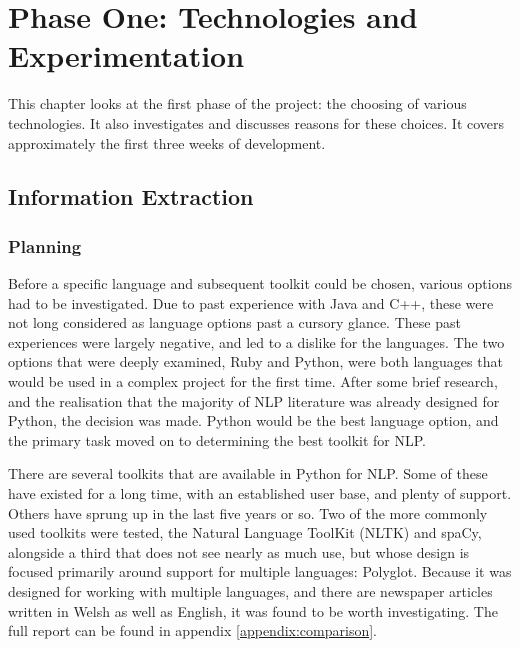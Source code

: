 \documentclass[11pt,a4paper]{book}
\begin{document}
\chapter{Phase One: Technologies and Experimentation}
This chapter looks at the first phase of the project: the choosing of various technologies. It also investigates and discusses reasons for these choices. It covers approximately the first three weeks of development.

\section{Information Extraction}
\subsection{Planning}
Before a specific language and subsequent toolkit could be chosen, various options had to be investigated. Due to past experience with Java and C++, these were not long considered as language options past a cursory glance. These past experiences were largely negative, and led to a dislike for the languages. 
The two options that were deeply examined, Ruby and Python, were both languages that would be used in a complex project for the first time. After some brief research, and the realisation that the majority of NLP literature was already designed for Python, the decision was made. Python would be the best language option, and the primary task moved on to determining the best toolkit for NLP. 

There are several toolkits that are available in Python for NLP. Some of these have existed for a long time, with an established user base, and plenty of support. Others have sprung up in the last five years or so. Two of the more commonly used toolkits were tested, the Natural Language ToolKit (NLTK) and spaCy, alongside a third that does not see nearly as much use, but whose design is focused primarily around support for multiple languages: Polyglot. Because it was designed for working with multiple languages, and there are newspaper articles written in Welsh as well as English, it was found to be worth investigating. The full report can be found in appendix \ref{appendix:comparison}.
\end{document}

